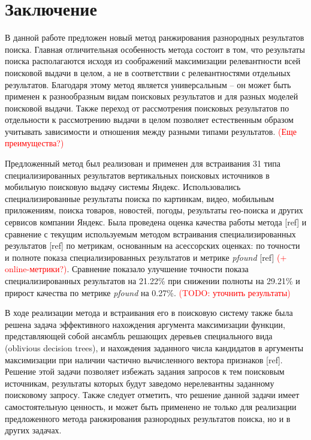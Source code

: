 \documentclass[12pt,a4paper]{report}
\newcommand\note[1]{\textcolor{red}{(#1)}}
\newcommand\todonote[1]{\note{TODO: #1}}
\begin{document}
\chapter*{Заключение}

В данной работе предложен новый метод ранжирования разнородных результатов поиска. Главная отличительная особенность метода состоит в том, что результаты поиска располагаются исходя из соображений максимизации релевантности всей поисковой выдачи в целом, а не в соответствии с релевантностями отдельных результатов. Благодаря этому метод является универсальным -- он может быть применен к разнообразным видам поисковых результатов и для разных моделей поисковой выдачи. Также переход от рассмотрения поисковых результатов по отдельности к рассмотрению выдачи в целом позволяет естественным образом учитывать зависимости и отношения между разными типами результатов. \note{Еще преимущества?}

%


Предложенный метод был реализован и применен для встраивания 31 типа специализированных результатов вертикальных поисковых источников в мобильную поисковую выдачу системы Яндекс. Использовались специализированные результаты поиска по картинкам, видео, мобильным приложениям, поиска товаров, новостей, погоды, результаты гео-поиска и других сервисов компании Яндекс. Была проведена оценка качества работы метода [ref] и сравнение с текущим используемым методом встраивания специализированных результатов [ref] по метрикам, основанным на асессорских оценках:  по точности и полноте показа специализированных результатов и метрике \textit{pfound} [ref] \note{+ online-метрики?}. Сравнение показало улучшение точности показа специализированных результатов на 21.22\% при снижении полноты на 29.21\% и прирост качества по метрике \textit{pfound} на 0.27\%. \todonote{уточнить результаты}

В ходе реализации метода и встраивания его в поисковую систему также была решена задача эффективного нахождения аргумента максимизации функции, представляющей собой ансамбль решающих деревьев специального вида (oblivious decision trees), и нахождения заданного числа кандидатов в аргументы максимизации при наличии частично вычисленного вектора признаков [ref]. Решение этой задачи позволяет избежать задания запросов к тем поисковым источникам, результаты которых будут заведомо нерелевантны заданному поисковому запросу. Также следует отметить, что решение данной задачи имеет самостоятельную ценность, и может быть применено не только для реализации предложенного метода ранжирования разнородных результатов поиска, но и в других задачах.
\end{document}
